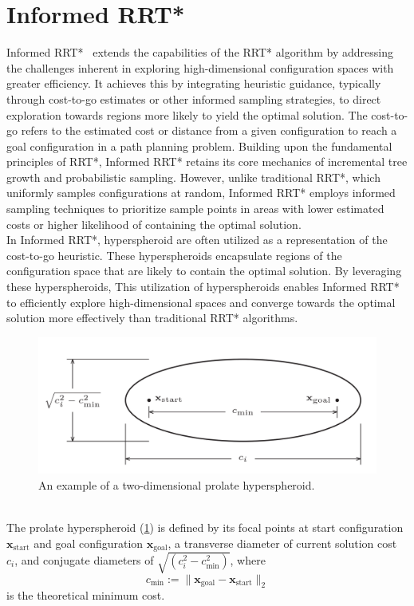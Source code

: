 \documentclass{ctuthesis}
\begin{document}
\section{Informed RRT*}
Informed RRT*~\cite{Gammell2018InformedRRTstar} extends the capabilities of the RRT* algorithm 
by addressing the challenges inherent in exploring high-dimensional configuration spaces 
with greater efficiency. 
It achieves this by integrating heuristic guidance, 
typically through cost-to-go estimates or other informed sampling strategies, 
to direct exploration towards regions more likely to yield the optimal solution.
The cost-to-go refers to the estimated cost or distance from a given 
configuration to reach a goal configuration in a path planning problem.  
Building upon the fundamental principles of RRT*, 
Informed RRT* retains its core mechanics of incremental tree growth and probabilistic sampling. 
However, unlike traditional RRT*, 
which uniformly samples configurations at random, 
Informed RRT* employs informed sampling techniques to prioritize sample 
points in areas with lower estimated costs or higher likelihood of containing 
the optimal solution.  
\\[12pt]
In Informed RRT*, 
hyperspheroid are often utilized as a representation of the cost-to-go heuristic. 
These hyperspheroids encapsulate regions of the configuration space that are likely 
to contain the optimal solution. 
By leveraging these hyperspheroids,   
This utilization of hyperspheroids enables Informed RRT* to efficiently 
explore high-dimensional spaces and converge towards the optimal solution more effectively 
than traditional RRT* algorithms.
\begin{figure}[!ht]
  \centering 
      \includegraphics[width=\textwidth]{figChap3/InformedRRTstar_elips.png}
      \caption{An example of a two-dimensional prolate hyperspheroid.}
      \label{fig:elips}  
\end{figure} 
\\[12pt]
The prolate hyperspheroid (\ref{fig:elips}) is defined by its focal points 
at start configuration \( \textbf{x}_{\text{start}} \) and goal configuration 
\( \textbf{x}_{\text{goal}} \), a transverse diameter of current solution cost \( c_i \), 
and conjugate diameters of \(\sqrt{( c_i^2 - c_{\text{min}}^2)} \), 
where \[ c_{\text{min}} := \| \textbf{x}_{\text{goal}} - \textbf{x}_{\text{start}} \|_2 \]
is the theoretical minimum cost.
\end{document}
